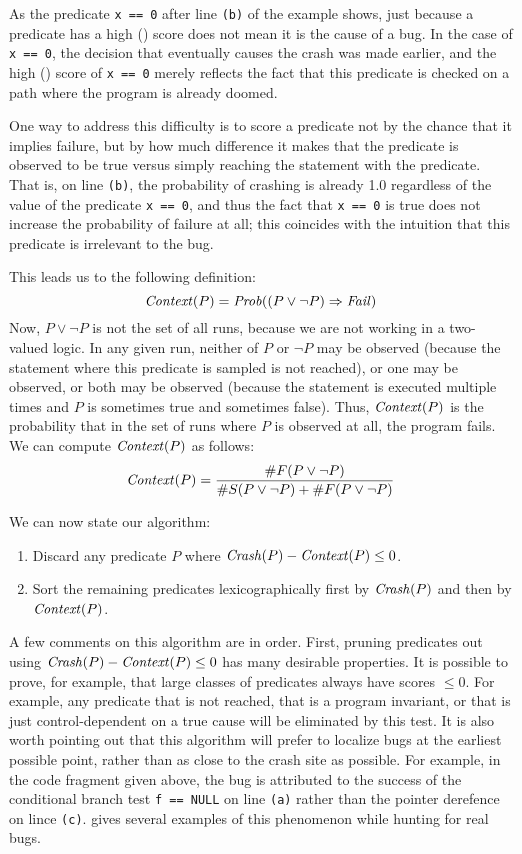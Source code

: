 As the predicate {\tt x == 0} after line {\tt (b)} of the example
shows, just because a predicate has a high \crash() score does not
mean it is the cause of a bug.  In the case of {\tt x == 0}, the
decision that eventually causes the crash was made earlier, and the
high \crash() score of {\tt x == 0} merely reflects the fact that this
predicate is checked on a path where the program is already doomed.

One way to address this difficulty is to score a predicate not by the chance
that it implies failure, but by how much difference it makes that the predicate
is observed to be true versus simply reaching the statement with the predicate.
That is, on line {\tt (b)}, the probability of crashing is already 1.0 regardless
of the value of the predicate {\tt x == 0}, and thus the fact that {\tt x == 0} is
true does not increase the probability of failure at all; this coincides with
the intuition that this predicate is irrelevant to the bug.

This leads us to the following definition:
\[ \mbox{\textit{Context}}(P) = \mbox{\textit{Prob}}((P \vee \neg P) \Rightarrow \mbox{\textit{Fail}}) \]
Now, $P \vee \neg P$ is not the set of all runs, because we are not working in a two-valued logic.
In any given run, neither of $P$ or $\neg P$ may be observed (because the statement where this predicate is
sampled is not reached), or one may be observed, or both may be observed (because the statement is executed
multiple times and $P$ is sometimes true and sometimes false).  Thus, $\mbox{\textit{Context}}(P)$ is the probability that
in the set of runs where $P$ is observed at all, the program fails. We can compute $\mbox{\textit{Context}}(P)$ as follows:
\[ \mbox{\textit{Context}}(P) = \frac{\#F(P \vee \neg P)}{\#S(P \vee \neg P) + \#F(P \vee \neg P)} \]

We can now state our algorithm:
\begin{enumerate}
\item Discard any predicate $P$ where $\mbox{\textit{Crash}}(P) - \mbox{\textit{Context}}(P) \leq 0$.

\item Sort the remaining predicates lexicographically first by $\mbox{\textit{Crash}}(P)$ and then by $\mbox{\textit{Context}}(P)$.
\end{enumerate}

A few comments on this algorithm are in order.  First, pruning
predicates out using $\mbox{\textit{Crash}}(P) - \mbox{\textit{Context}}(P) \leq 0$ has many
desirable properties.  It is possible to prove, for example, that
large classes of predicates always have scores $\leq 0$.  For example,
any predicate that is not reached, that is a program invariant, or
that is just control-dependent on a true cause will be eliminated by
this test.  It is also worth pointing out that this algorithm will
prefer to localize bugs at the earliest possible point, rather than
as close to the crash site as possible.  For example, in the code fragment
given above, the bug is attributed to the success of the conditional branch
test {\tt f == NULL} on line {\tt (a)} rather than the pointer derefence
on lince {\tt (c)}.   gives several examples of
this phenomenon while hunting for real bugs.

